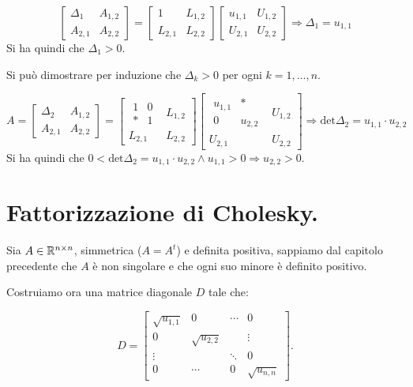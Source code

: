 \[\left[
\begin{array}{c|c}
\Delta_1 & A_{1,2} \\
\hline
A_{2,1} & A_{2,2}
\end{array}\right] =
\left[
\begin{array}{c|c}
1 & L_{1,2} \\
\hline
L_{2,1} & L_{2,2}
\end{array}\right] \left[
\begin{array}{c|c}
u_{1,1} & U_{1,2} \\
\hline
U_{2,1} & U_{2,2}
\end{array}\right]  \Rightarrow \Delta_1 = u_{1,1}\]
Si ha quindi che $\Delta_1 > 0$.

Si può dimostrare per induzione che $\Delta_k > 0$ per ogni $k = 1, \ldots,
n$.

\[A = \left[
\begin{array}{c|c}
\Delta_2 & A_{1,2} \\
\hline
A_{2,1} & A_{2,2}
\end{array}\right] =
\left[
\begin{array}{c|c}
\begin{array}{cc}
1 & 0 \\
* & 1
\end{array} & L_{1,2} \\
\hline
L_{2,1} & L_{2,2}
\end{array}\right]\left[
\begin{array}{c|c}
\begin{array}{cc}
u_{1,1} & * \\
0 & u_{2,2}
\end{array} & U_{1,2} \\
\hline
U_{2,1} & U_{2,2}
\end{array}\right]  \Rightarrow \textrm{det}\Delta_2 = u_{1,1}\cdot u_{2,2}\]
Si ha quindi che $0 < \textrm{det}\Delta_2 = u_{1,1}\cdot u_{2,2} \wedge u_{1,1}
> 0
\Rightarrow u_{2,2} > 0$.


\section{Fattorizzazione di Cholesky.}
Sia $A \in \mathbb{R}^{n \times n}$, simmetrica ($A = A^t$) e definita positiva,
sappiamo dal capitolo
precedente che $A$ è non singolare e che ogni suo minore è definito positivo.

Costruiamo ora una matrice diagonale $D$ tale che:

\[D = \left[
\begin{array}{cccc}
\sqrt{u_{1,1}} & 0 & \cdots & 0 \\
0 & \sqrt{u_{2,2}} & & \vdots \\
\vdots & & \ddots & 0 \\
0 &\cdots & 0 & \sqrt{u_{n,n}}
\end{array}
\right].\]

